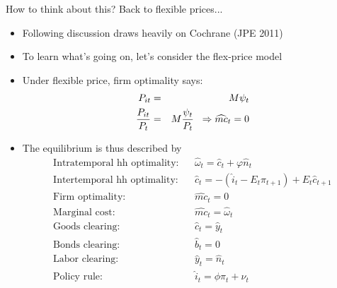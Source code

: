 \documentclass[9pt,xcolor={dvipsnames}]{beamer}
\newcommand{\bit}{\begin{itemize}}
\newcommand{\eit}{\end{itemize}}
\begin{document}
\begin{frame}{How to think about this? Back to flexible prices...}

\bit
\setlength\itemsep{1em}

\item Following discussion draws heavily on Cochrane (JPE 2011)

\item To learn what's going on, let's consider the flex-price model

\item Under flexible price, firm optimality says:
\begin{eqnarray}
P_{it} &=& M \psi_t \nonumber \\
\frac{P_{it}}{P_t} &=& M \frac{\psi_t}{P_t} \hspace{2mm} \Rightarrow \widehat{mc}_t = 0 \nonumber
\end{eqnarray}

\item The equilibrium is thus described by
\begin{eqnarray}
\text{Intratemporal hh optimality:} && \hat \omega_t = \hat c_t + \varphi \hat n_t  \nonumber \\
\text{Intertemporal hh optimality:} && \hat c_t =  - (\hat i_t - E_t \pi_{t+1}) + E_t \hat c_{t+1}  \nonumber \\
\text{Firm optimality:} && \widehat{mc}_t = 0 \nonumber \\
\text{Marginal cost:} && \widehat{mc}_t = \hat \omega_t \nonumber \\
\text{Goods clearing:} && \hat c_t = \hat y_t \nonumber \\
\text{Bonds clearing:} && \hat b_t = 0 \nonumber \\
\text{Labor clearing:} && \hat y_t = \hat n_t \nonumber \\
\text{Policy rule:} && \hat i_t = \phi \pi_t + \nu_t \nonumber 
\end{eqnarray}
\eit

\end{frame}
\end{document}
